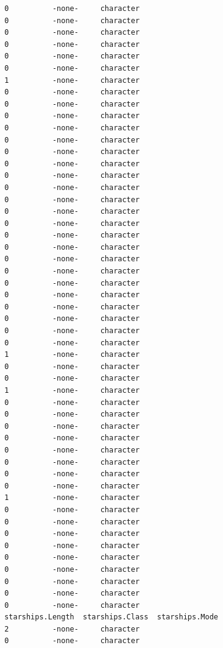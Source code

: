 \documentclass[
  letterpaper,
  DIV=11,
  numbers=noendperiod]{scrreprt}
\begin{document}
\begin{verbatim}
 0          -none-     character               
 0          -none-     character               
 0          -none-     character               
 0          -none-     character               
 0          -none-     character               
 0          -none-     character               
 1          -none-     character               
 0          -none-     character               
 0          -none-     character               
 0          -none-     character               
 0          -none-     character               
 0          -none-     character               
 0          -none-     character               
 0          -none-     character               
 0          -none-     character               
 0          -none-     character               
 0          -none-     character               
 0          -none-     character               
 0          -none-     character               
 0          -none-     character               
 0          -none-     character               
 0          -none-     character               
 0          -none-     character               
 0          -none-     character               
 0          -none-     character               
 0          -none-     character               
 0          -none-     character               
 0          -none-     character               
 0          -none-     character               
 1          -none-     character               
 0          -none-     character               
 0          -none-     character               
 1          -none-     character               
 0          -none-     character               
 0          -none-     character               
 0          -none-     character               
 0          -none-     character               
 0          -none-     character               
 0          -none-     character               
 0          -none-     character               
 0          -none-     character               
 1          -none-     character               
 0          -none-     character               
 0          -none-     character               
 0          -none-     character               
 0          -none-     character               
 0          -none-     character               
 0          -none-     character               
 0          -none-     character               
 0          -none-     character               
 0          -none-     character               
 starships.Length  starships.Class  starships.Mode
 2          -none-     character                  
 0          -none-     character                  

\end{verbatim}
\end{document}
